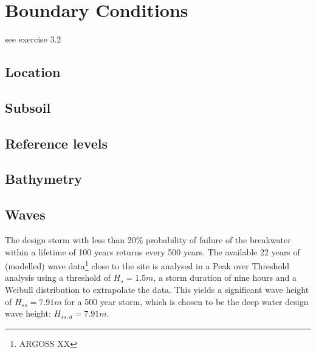\chapter{Boundary Conditions}

see exercise 3.2

\section{Location}

\section{Subsoil}

\section{Reference levels}

\section{Bathymetry}

\section{Waves}
The design storm with less than 20\% probability of failure of the breakwater within a lifetime of 100 years returns every 500 years.
The available 22 years of (modelled) wave data\footnote{ARGOSS XX} close to the site is analysed in a Peak over Threshold analysis using a threshold of $H_s=1.5m$, a storm duration of nine hours and a Weibull distribution to extrapolate the data.
This yields a significant wave height of $H_{ss}=7.91m$ for a 500 year storm, which is chosen to be the deep water design wave height: $H_{ss,d}=7.91m$.


